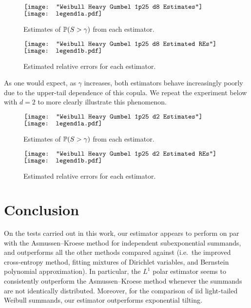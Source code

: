 \begin{figure}[H]
	\centering
	$\vcenter{\hbox{\texttt{[image: "Weibull Heavy Gumbel 1p25 d8 Estimates"]}}}$
 	\hspace*{.1in}
 	$\vcenter{\hbox{\texttt{[image: legend1a.pdf]}}}$
	\caption{Estimates of $\operatorname{{\mathbb P}}(S > \gamma)$ from each estimator.}
\end{figure}

\begin{figure}[H]
	\centering
	$\vcenter{\hbox{\texttt{[image: "Weibull Heavy Gumbel 1p25 d8 Estimated REs"]}}}$
 	\hspace*{.1in}
 	$\vcenter{\hbox{\texttt{[image: legend1b.pdf]}}}$
	\caption{Estimated relative errors for each estimator.}
\end{figure}

As one would expect, as $\gamma$ increases, both estimators behave increasingly poorly due to the upper-tail dependence of this copula.
We repeat the experiment below with $d=2$ to more clearly illustrate this phenomenon.

\begin{figure}[H]
	\centering
	$\vcenter{\hbox{\texttt{[image: "Weibull Heavy Gumbel 1p25 d2 Estimates"]}}}$
 	\hspace*{.1in}
 	$\vcenter{\hbox{\texttt{[image: legend1a.pdf]}}}$
	\caption{Estimates of $\operatorname{{\mathbb P}}(S > \gamma)$ from each estimator.}
\end{figure}

\begin{figure}[H]
	\centering
	$\vcenter{\hbox{\texttt{[image: "Weibull Heavy Gumbel 1p25 d2 Estimated REs"]}}}$
 	\hspace*{.1in}
 	$\vcenter{\hbox{\texttt{[image: legend1b.pdf]}}}$
	\caption{Estimated relative errors for each estimator.}
\end{figure}


\section{Conclusion} \label{Sec:Conclusion}


On the tests carried out in this work, our estimator appears to perform on par with the Asmussen--Kroese method for independent subexponential summands, and outperforms all the other methods compared against (i.e.\ the improved cross-entropy method, fitting mixtures of Dirichlet variables, and Bernstein polynomial approximation). In particular, the $L^1$ polar estimator seems to consistently outperform the Asmussen--Kroese method whenever the summands are not identically distributed.  Moreover, for the comparison of iid light-tailed Weibull summands, our estimator outperforms exponential tilting.

